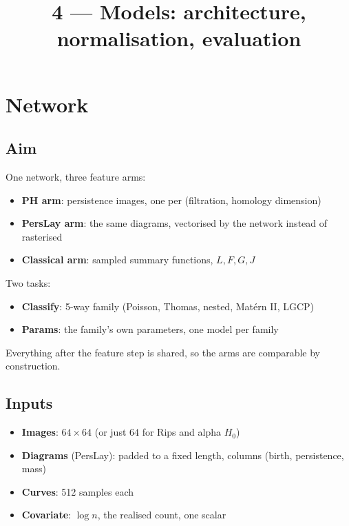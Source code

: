 \documentclass[11pt]{article}
\title{4 --- Models: architecture, normalisation, evaluation}
\date{}
\begin{document}
\maketitle

\section{Network}

\subsection*{Aim}
One network, three feature arms:
\begin{itemize}
  \item \textbf{PH arm}: persistence images, one per (filtration, homology dimension)
  \item \textbf{PersLay arm}: the same diagrams, vectorised by the network instead of rasterised
  \item \textbf{Classical arm}: sampled summary functions, $L,F,G,J$
\end{itemize}
Two tasks:
\begin{itemize}
  \item \textbf{Classify}: 5-way family (Poisson, Thomas, nested, Mat\'ern II, LGCP)
  \item \textbf{Params}: the family's own parameters, one model per family
\end{itemize}
Everything after the feature step is shared, so the arms are comparable by construction.

\subsection*{Inputs}
\begin{itemize}
  \item \textbf{Images}: $64\times64$ (or just $64$ for Rips and alpha $H_0$)
  \item \textbf{Diagrams} (PersLay): padded to a fixed length, columns (birth, persistence, mass)
  \item \textbf{Curves}: 512 samples each
  \item \textbf{Covariate}: $\log n$, the realised count, one scalar
\end{itemize}
\end{document}
